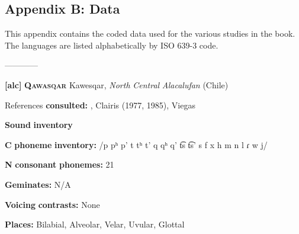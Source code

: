 \documentclass[output=paper]{langsci/langscibook}
\author{\affiliation{}\orcid{}}
\title{}
\begin{document}
\maketitle 


\subsection{Appendix B: Data}
\begin{styleBody}
This appendix contains the coded data used for the various studies in the book. The languages are listed alphabetically by ISO 639-3 code.
\end{styleBody}

\begin{styleBody}
————
\end{styleBody}

\begin{styleBody}
\textbf{[alc]}   \textbf{\textsc{Qawasqar}}  Kawesqar, \textit{North} \textit{Central} \textit{Alacalufan} (Chile)
\end{styleBody}

\begin{styleBody}
References \textbf{consulted:} \citet{Aguilera2001}, Clairis (1977, 1985), Viegas \citet{Barros1990}
\end{styleBody}

\begin{styleBody}
\textbf{Sound} \textbf{inventory}
\end{styleBody}

\begin{styleBody}
\textbf{C} \textbf{phoneme} \textbf{inventory:} /p pʰ p’ t tʰ t’ q qʰ q’ t͡s t͡s’ s f x h m n l ɾ w j/
\end{styleBody}

\begin{styleBody}
\textbf{N} \textbf{consonant} \textbf{phonemes:} 21
\end{styleBody}

\begin{styleBody}
\textbf{Geminates:} N/A
\end{styleBody}

\begin{styleBody}
\textbf{Voicing} \textbf{contrasts:} None
\end{styleBody}

\begin{styleBody}
\textbf{Places:} Bilabial, Alveolar, Velar, Uvular, Glottal
\end{styleBody}
\end{document}
